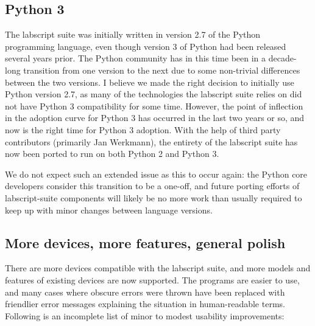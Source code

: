 \subsection{Python 3}

The labscript suite was initially written in version 2.7 of the Python programming language, even though version 3 of Python had been released several years prior. The Python community has in this time been in a decade-long transition from one version to the next due to some non-trivial differences between the two versions. I believe we made the right decision to initially use Python version 2.7, as many of the technologies the labscript suite relies on did not have Python 3 compatibility for some time. However, the point of inflection in the adoption curve for Python 3 has occurred in the last two years or so, and now is the right time for Python 3 adoption. With the help of third party contributors (primarily Jan Werkmann), the entirety of the labscript suite has now been ported to run on both Python 2 and Python 3.

We do not expect such an extended issue as this to occur again: the Python core developers consider this transition to be a one-off, and future porting efforts of labscript-suite components will likely be no more work than usually required to keep up with minor changes between language versions.

\subsection{More devices, more features, general polish}

There are more devices compatible with the labscript suite, and more models and features of existing devices are now supported. The programs are easier to use, and many cases where obscure errors were thrown have been replaced with friendlier error messages explaining the situation in human-readable terms. Following is an incomplete list of minor to modest usability improvements:

